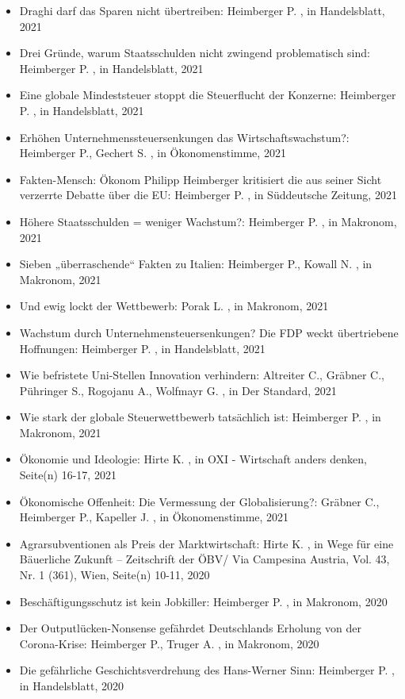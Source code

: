 \begin{itemize}
\item Draghi darf das Sparen nicht übertreiben: Heimberger P. , in Handelsblatt, 2021
\item Drei Gründe, warum Staatsschulden nicht zwingend problematisch sind: Heimberger P. , in Handelsblatt, 2021
\item Eine globale Mindeststeuer stoppt die Steuerflucht der Konzerne: Heimberger P. , in Handelsblatt, 2021
\item Erhöhen Unternehmenssteuersenkungen das Wirtschaftswachstum?: Heimberger P., Gechert S. , in Ökonomenstimme, 2021
\item Fakten-Mensch: Ökonom Philipp Heimberger kritisiert die aus seiner Sicht verzerrte Debatte über die EU: Heimberger P. , in Süddeutsche Zeitung, 2021
\item Höhere Staatsschulden = weniger Wachstum?: Heimberger P. , in Makronom, 2021
\item Sieben „überraschende“ Fakten zu Italien: Heimberger P., Kowall N. , in Makronom, 2021
\item Und ewig lockt der Wettbewerb: Porak L. , in Makronom, 2021
\item Wachstum durch Unternehmensteuersenkungen? Die FDP weckt übertriebene Hoffnungen: Heimberger P. , in Handelsblatt, 2021
\item Wie befristete Uni-Stellen Innovation verhindern: Altreiter C., Gräbner C., Pühringer S., Rogojanu A., Wolfmayr G. , in Der Standard, 2021
\item Wie stark der globale Steuerwettbewerb tatsächlich ist: Heimberger P. , in Makronom, 2021
\item Ökonomie und Ideologie: Hirte K. , in OXI - Wirtschaft anders denken, Seite(n) 16-17, 2021
\item Ökonomische Offenheit: Die Vermessung der Globalisierung?: Gräbner C., Heimberger P., Kapeller J. , in Ökonomenstimme, 2021
\item Agrarsubventionen als Preis der Marktwirtschaft: Hirte K. , in Wege für eine Bäuerliche Zukunft – Zeitschrift der ÖBV/ Via Campesina Austria, Vol. 43, Nr. 1 (361), Wien, Seite(n) 10-11, 2020
\item Beschäftigungsschutz ist kein Jobkiller: Heimberger P. , in Makronom, 2020
\item Der Outputlücken-Nonsense gefährdet Deutschlands Erholung von der Corona-Krise: Heimberger P., Truger A. , in Makronom, 2020
\item Die gefährliche Geschichtsverdrehung des Hans-Werner Sinn: Heimberger P. , in Handelsblatt, 2020

\end{itemize}
